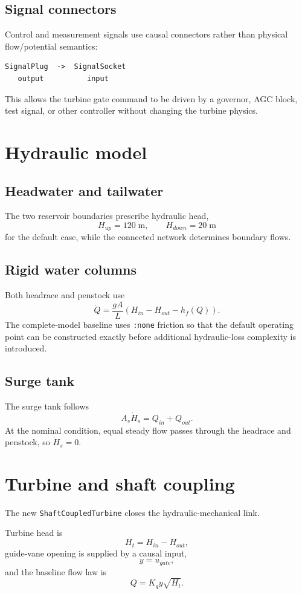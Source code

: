 \documentclass[11pt,a4paper]{article}
\begin{document}
\subsection{Signal connectors}
Control and measurement signals use causal connectors rather than physical flow/potential semantics:
\begin{verbatim}
SignalPlug  ->  SignalSocket
   output          input
\end{verbatim}
This allows the turbine gate command to be driven by a governor, AGC block, test signal, or other controller without changing the turbine physics.

\section{Hydraulic model}
\subsection{Headwater and tailwater}
The two reservoir boundaries prescribe hydraulic head,
\[
H_{up}=120\;\mathrm{m}, \qquad H_{down}=20\;\mathrm{m}
\]
for the default case, while the connected network determines boundary flows.

\subsection{Rigid water columns}
Both headrace and penstock use
\[
\dot Q =
\frac{gA}{L}
\left(
H_{in}-H_{out}-h_f(Q)
\right).
\]
The complete-model baseline uses \texttt{:none} friction so that the default operating point can be constructed exactly before additional hydraulic-loss complexity is introduced.

\subsection{Surge tank}
The surge tank follows
\[
A_s\dot H_s = Q_{in}+Q_{out}.
\]
At the nominal condition, equal steady flow passes through the headrace and penstock, so \(\dot H_s=0\).

\section{Turbine and shaft coupling}
The new \texttt{ShaftCoupledTurbine} closes the hydraulic-mechanical link.

Turbine head is
\[
H_t=H_{in}-H_{out},
\]
guide-vane opening is supplied by a causal input,
\[
y=u_{gate},
\]
and the baseline flow law is
\[
Q=K_q y\sqrt{H_t}.
\]
\end{document}
